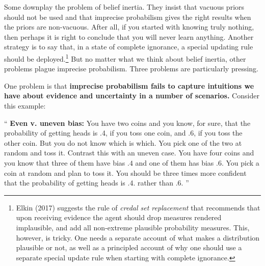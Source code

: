 \documentclass[
  10pt,
  dvipsnames,enabledeprecatedfontcommands]{scrartcl}
\renewenvironment{quote}
{\list{}{\leftmargin=1em\rightmargin=1em}\item[]``}
{''\endlist}
\begin{document}
Some downplay the problem of belief inertia. They insist that vacuous
priors should not be used and that imprecise probabilism gives the right
results when the priors are non-vacuous. After all, if you started with
knowing truly nothing, then perhaps it is right to conclude that you
will never learn anything. Another strategy is to say that, in a state
of complete ignorance, a special updating rule should be
deployed.\footnote{Elkin (2017) suggests the rule of
  \emph{credal set replacement} that recommends that upon receiving
  evidence the agent should drop measures rendered implausible, and add
  all non-extreme plausible probability measures. This, however, is
  tricky. One needs a separate account of what makes a distribution
  plausible or not, as well as a principled account of why one should
  use a separate special update rule when starting with complete
  ignorance.} But no matter what we think about belief inertia, other
problems plague imprecise probabilism. Three problems are particularly
pressing.

One problem is that \textbf{imprecise probabilism fails to capture
intuitions we have about evidence and uncertainty in a number of
scenarios.} Consider this example:

\begin{quote}
\textbf{Even v. uneven bias:}
 You have two coins and you know, for sure, that the probability of getting heads is .4, if you toss one coin, and .6, if you toss the other coin. But you do not know which is which. You pick one of the two at random and toss it.  Contrast this with an uneven case. You have four coins and you know that three of them have bias $.4$ and one of them has bias $.6$. You pick a coin at random and plan to toss it. You should be three times more confident that the probability of getting heads is .4. rather than .6.
\end{quote}
\end{document}
